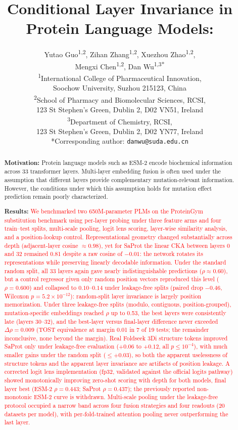 \documentclass[11pt,a4paper]{article}
\title{\LARGE\bfseries Conditional Layer Invariance in Protein Language Models:\\\revised{Position Leakage and Readout Choice Determine the Apparent Benefit of Multi-Scale Embeddings}}
\author{
\large
Yutao Guo\textsuperscript{1,2}, Zihan Zhang\textsuperscript{1,2}, Xuezhou Zhao\textsuperscript{1,2},\\[2pt]
Mengxi Chen\textsuperscript{1,2}, Dan Wu\textsuperscript{1,3*}\\[8pt]
\small
\textsuperscript{1}International College of Pharmaceutical Innovation,\\
\hspace*{1em}Soochow University, Suzhou 215123, China\\[4pt]
\textsuperscript{2}School of Pharmacy and Biomolecular Sciences, RCSI,\\
\hspace*{1em}123 St Stephen's Green, Dublin 2, D02 VN51, Ireland\\[4pt]
\textsuperscript{3}Department of Chemistry, RCSI,\\
\hspace*{1em}123 St Stephen's Green, Dublin 2, D02 YN77, Ireland\\[8pt]
*Corresponding author: \texttt{danwu@suda.edu.cn}}
\date{}
\newcommand{\revised}[1]{\textcolor{red}{#1}}
\begin{document}
\maketitle

\begin{abstract}
\textbf{Motivation:} Protein language models such as ESM-2 encode biochemical information across
33 transformer layers. Multi-layer embedding fusion is often used under the assumption
that different layers provide complementary mutation-relevant information. However,
the conditions under which this assumption holds for mutation effect prediction remain
poorly characterized.

\textbf{Results:} \revised{We benchmarked two 650M-parameter PLMs on the ProteinGym substitution
benchmark using per-layer probing under three feature arms and four train--test splits,
multi-scale pooling, logit lens scoring, layer-wise similarity analysis, and a
position-lookup control. Representational geometry changed substantially across depth
(adjacent-layer cosine $\approx 0.98$), yet for SaProt the linear CKA between layers 0
and 32 remained 0.81 despite a raw cosine of $-0.01$: the network rotates its
representations while preserving linearly decodable information. Under the standard
random split, all 33 layers again gave nearly indistinguishable predictions
($\rho \approx 0.60$), but a control regressor given only random position vectors
reproduced this level ($\rho = 0.600$) and collapsed to $0.10$--$0.14$ under
leakage-free splits (paired drop $-0.46$, Wilcoxon $p = 5.2 \times 10^{-12}$):
random-split layer invariance is largely position memorization. Under three
leakage-free splits (modulo, contiguous, position-grouped), mutation-specific
embeddings reached $\rho$ up to 0.53, the best layers were consistently late (layers
30--32), and the best-layer versus final-layer difference never exceeded
$\Delta\rho = 0.009$ (TOST equivalence at margin 0.01 in 7 of 19 tests; the remainder
inconclusive, none beyond the margin). Real Foldseek 3Di structure tokens improved
SaProt only under leakage-free evaluation ($+0.06$ to $+0.12$, all $p \leq 10^{-4}$),
with much smaller gains under the random split ($\leq +0.03$), so both the apparent
uselessness of structure tokens and the apparent layer invariance are artifacts of
position leakage. A corrected logit lens implementation (fp32, validated against the
official logits pathway) showed monotonically improving zero-shot scoring with depth
for both models, final layer best (ESM-2 $\rho = 0.443$; SaProt $\rho = 0.437$); the
previously reported non-monotonic ESM-2 curve is withdrawn. Multi-scale pooling under
the leakage-free protocol occupied a narrow band across four fusion strategies and
four readouts (20 datasets per model), with per-fold-trained attention pooling never
outperforming the last layer.}


\end{abstract}
\end{document}
